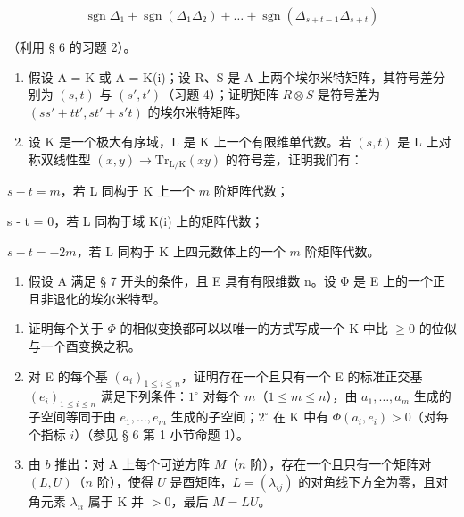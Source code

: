 \[
\operatorname{sgn} \Delta_ {1} + \operatorname{sgn} \left(\Delta_ {1} \Delta_ {2}\right) + \dots + \operatorname{sgn} \left(\Delta_ {s + t - 1} \Delta_ {s + t}\right)
\]

（利用 § 6 的习题 2）。

\begin{enumerate}
\def\labelenumi{\arabic{enumi})}
\setcounter{enumi}{4}
\item
  假设 A = K 或 A = K(i)；设 R、S 是 A 上两个埃尔米特矩阵，其符号差分别为 \((s, t)\) 与 \((s', t')\)（习题 4）；证明矩阵 \(R \otimes S\) 是符号差为 \((ss' + tt', st' + s't)\) 的埃尔米特矩阵。
\item
  设 K 是一个极大有序域，L 是 K 上一个有限维单代数。若 \((s, t)\) 是 L 上对称双线性型 \((x, y) \to \mathrm{Tr}_{\mathrm{L/K}}(xy)\) 的符号差，证明我们有：
\end{enumerate}

\(s-t=m\)，若 L 同构于 K 上一个 \(m\) 阶矩阵代数；

s - t = 0，若 L 同构于域 K(i) 上的矩阵代数；

\(s - t = -2m\)，若 L 同构于 K 上四元数体上的一个 \(m\) 阶矩阵代数。

\begin{enumerate}
\def\labelenumi{\arabic{enumi})}
\setcounter{enumi}{6}
\tightlist
\item
  假设 A 满足 § 7 开头的条件，且 E 具有有限维数 n。设 Φ 是 E 上的一个正且非退化的埃尔米特型。
\end{enumerate}

\begin{enumerate}
\def\labelenumi{\alph{enumi})}
\item
  证明每个关于 \(\Phi\) 的相似变换都可以以唯一的方式写成一个 K 中比 \(\geqslant 0\) 的位似与一个酉变换之积。
\item
  对 E 的每个基 \((a_{i})_{1\leqslant i\leqslant n}\)，证明存在一个且只有一个 E 的标准正交基 \((e_{i})_{1\leqslant i\leqslant n}\) 满足下列条件：\(1^{\circ}\) 对每个 \(m\)（\(1\leqslant m\leqslant n\)），由 \(a_1,\ldots ,a_m\) 生成的子空间等同于由 \(e_1,\ldots ,e_m\) 生成的子空间；\(2^{\circ}\) 在 K 中有 \(\Phi (a_i,e_i) > 0\)（对每个指标 \(i\)）（参见 § 6 第 1 小节命题 1）。
\item
  由 \(b\) 推出：对 A 上每个可逆方阵 \(M\)（\(n\) 阶），存在一个且只有一个矩阵对 \((L, U)\)（\(n\) 阶），使得 \(U\) 是酉矩阵，\(L = (\lambda_{ij})\) 的对角线下方全为零，且对角元素 \(\lambda_{ii}\) 属于 K 并 \(>0\)，最后 \(M = LU\)。
\end{enumerate}

